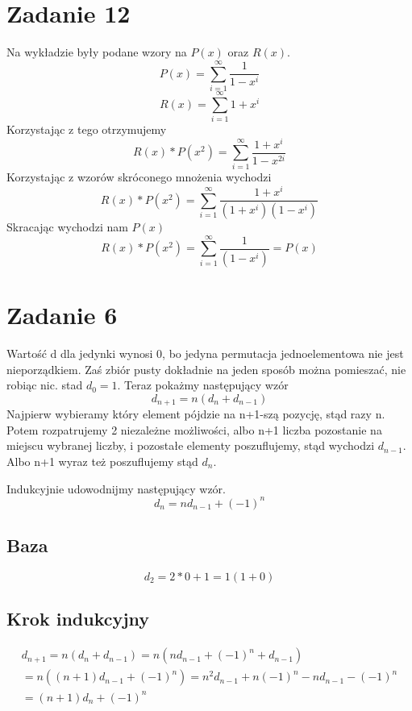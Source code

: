 \documentclass{article}
\begin{document}
\section*{Zadanie 12}
Na wykładzie były podane wzory na $P(x)$ oraz $R(x)$.
\[
  P(x) = \sum_{i=1}^{\infty} \frac{1}{1 - x^i}  
\]
\[
    R(x) = \sum_{i=1}^{\infty} 1 + x^i
\]
Korzystając z tego otrzymujemy
\[
    R(x) * P(x^2) = \sum_{i=1}^{\infty} \frac{ 1 + x^i}{1 - x^{2i}} 
\]
Korzystając z wzorów skróconego mnożenia wychodzi
\[
    R(x) * P(x^2) = \sum_{i=1}^{\infty} \frac{ 1 + x^i}{(1+x^i)(1-x^i)}
\]
Skracając wychodzi nam $P(x)$
\[
    R(x) * P(x^2) = \sum_{i=1}^{\infty} \frac{ 1 }{(1-x^i)}=P(x)
\]
\section*{Zadanie 6}
Wartość d dla jedynki wynosi 0, bo jedyna permutacja jednoelementowa nie jest nieporządkiem. Zaś zbiór pusty dokładnie na jeden sposób można pomieszać, nie robiąc nic. stad $d_0 = 1$. Teraz pokażmy następujący wzór
\[
    d_{n+1} = n (d_n + d_{n-1})    
\]
Najpierw wybieramy który element pójdzie na n+1-szą pozycję, stąd razy n.
Potem rozpatrujemy 2 niezależne możliwości, albo n+1 liczba pozostanie na miejscu wybranej liczby, i pozostałe elementy poszuflujemy, stąd wychodzi $d_{n-1}$. Albo n+1 wyraz też poszuflujemy stąd $d_n$.



Indukcyjnie udowodnijmy następujący wzór. 
\[
  d_n = n d_{n-1} + (-1)^n  
\]
\subsection*{Baza}
\[
  d_2 = 2 * 0 + 1 = 1 (1 + 0)
\]

\subsection*{Krok indukcyjny}
\begin{equation}
    \begin{split}
    d_{n+1} = n (d_n  + d_{n-1}) = n(n d_{n-1} + (-1)^n + d_{n-1})  \\
    = n ((n+1) d_{n-1} +(-1)^n) = n^2 d_{n-1} + n(-1)^n - n d_{n-1} - (-1)^n \\
    = (n+1) d_n + (-1)^n
\end{split}
\end{equation}
\end{document}
